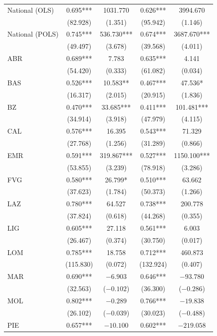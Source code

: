 \documentclass[12pt]{article}
\begin{document}
\begin{longtable}{@{}lcccc@{}}
        National (OLS) & 0.695*** & 1031.770 & 0.626*** & 3994.670 \\ 
         & (82.928) & (1.351) & (95.942) & (1.146) \\ 
        National (POLS) & 0.745*** & 536.730*** & 0.674*** & 3687.670*** \\ 
         & (49.497) & (3.678) & (39.568) & (4.011) \\ 
        ABR & 0.689*** & 7.783 & 0.635*** & 4.141 \\ 
         & (54.420) & (0.333) & (61.082) & (0.034) \\ 
        BAS & 0.526*** & 10.583** & 0.467*** & 47.536* \\ 
         & (16.317) & (2.015) & (20.915) & (1.836) \\ 
        BZ & 0.470*** & 33.685*** & 0.411*** & 101.481*** \\ 
         & (34.914) & (3.918) & (47.979) & (4.115) \\ 
        CAL & 0.576*** & 16.395 & 0.543*** & 71.329 \\ 
         & (27.768) & (1.256) & (31.289) & (0.866) \\ 
        EMR & 0.591*** & 319.867*** & 0.527*** & 1150.100*** \\ 
         & (53.855) & (3.239) & (78.918) & (3.286) \\ 
        FVG & 0.580*** & 26.799* & 0.510*** & 63.662 \\ 
         & (37.623) & (1.784) & (50.373) & (1.266) \\ 
        LAZ & 0.780*** & 64.527 & 0.738*** & 200.778 \\ 
         & (37.824) & (0.618) & (44.268) & (0.355) \\ 
        LIG & 0.605*** & 27.118 & 0.561*** & 6.003 \\ 
         & (26.467) & (0.374) & (30.750) & (0.017) \\ 
        LOM & 0.785*** & 18.758 & 0.712*** & 460.873 \\ 
         & (115.830) & (0.072) & (132.924) & (0.407) \\ 
        MAR & 0.690*** & $-6.903$ & 0.646*** & $-93.780$ \\ 
         & (32.563) & ($-0.102$) & (36.300) & ($-0.286$) \\ 
        MOL & 0.802*** & $-0.289$ & 0.766*** & $-19.838$ \\ 
         & (26.102) & ($-0.039$) & (30.023) & ($-0.488$) \\ 
        PIE & 0.657*** & $-10.100$ & 0.602*** & $-219.058$ \\ 

\end{longtable}
\end{document}
